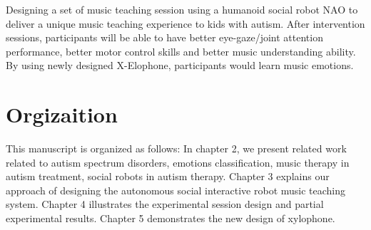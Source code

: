 \item 
Designing a set of music teaching session using a humanoid social robot
NAO to deliver a unique music teaching experience to kids with autism.
After intervention sessions, participants will be able to have better
eye-gaze/joint attention performance, better motor control skills and 
better music understanding ability. By using newly designed X-Elophone, 
participants would learn music
emotions.\\

\ei


\section{Orgizaition}
This manuscript is organized as follows: In chapter 2, we present related
work related to autism spectrum disorders, emotions classification, music
therapy in autism treatment, social robots in autism therapy. Chapter 3
explains our approach of designing the autonomous social interactive robot
music teaching system. Chapter 4 illustrates the experimental session design
and partial experimental results. Chapter 5 demonstrates the new design of 
xylophone.
